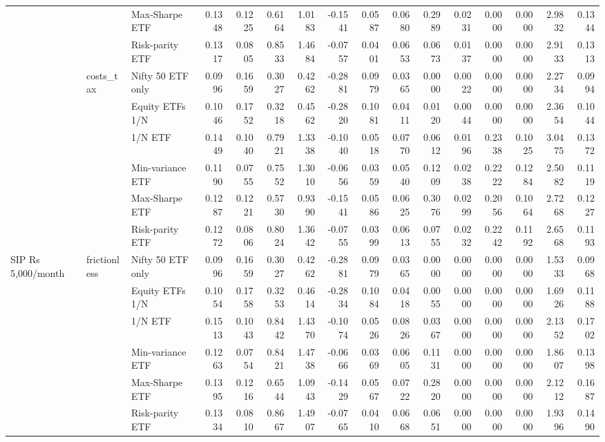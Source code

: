 \begin{table}
{\begin{tabular}{lllrrrrrrrrrrrrr}
 &  & Max-Sharpe ETF & 0.1348 & 0.1225 & 0.6164 & 1.0183 & -0.1541 & 0.0587 & 0.0680 & 0.2989 & 0.0231 & 0.0000 & 0.0000 & 2.9832 & 0.1344 \\
 &  & Risk-parity ETF & 0.1317 & 0.0805 & 0.8533 & 1.4684 & -0.0757 & 0.0401 & 0.0653 & 0.0673 & 0.0137 & 0.0000 & 0.0000 & 2.9133 & 0.1313 \\
\cline{2-16}
 & \multirow[t]{6}{*}{costs\_tax} & Nifty 50 ETF only & 0.0996 & 0.1659 & 0.3027 & 0.4262 & -0.2881 & 0.0979 & 0.0365 & 0.0000 & 0.0022 & 0.0000 & 0.0000 & 2.2734 & 0.0994 \\
 &  & Equity ETFs 1/N & 0.1046 & 0.1752 & 0.3218 & 0.4562 & -0.2820 & 0.1081 & 0.0411 & 0.0120 & 0.0044 & 0.0000 & 0.0000 & 2.3654 & 0.1044 \\
 &  & 1/N ETF & 0.1449 & 0.1040 & 0.7921 & 1.3338 & -0.1040 & 0.0518 & 0.0770 & 0.0612 & 0.0196 & 0.2338 & 0.1025 & 3.0475 & 0.1372 \\
 &  & Min-variance ETF & 0.1190 & 0.0755 & 0.7552 & 1.3010 & -0.0656 & 0.0359 & 0.0540 & 0.1209 & 0.0238 & 0.2222 & 0.1284 & 2.5082 & 0.1119 \\
 &  & Max-Sharpe ETF & 0.1287 & 0.1221 & 0.5730 & 0.9390 & -0.1541 & 0.0586 & 0.0625 & 0.3076 & 0.0299 & 0.2056 & 0.1064 & 2.7268 & 0.1227 \\
 &  & Risk-parity ETF & 0.1272 & 0.0806 & 0.8024 & 1.3642 & -0.0755 & 0.0399 & 0.0613 & 0.0755 & 0.0232 & 0.2242 & 0.1192 & 2.6568 & 0.1193 \\
\cline{1-16} \cline{2-16}
\multirow[t]{18}{*}{SIP Rs 5,000/month} & \multirow[t]{6}{*}{frictionless} & Nifty 50 ETF only & 0.0996 & 0.1659 & 0.3027 & 0.4262 & -0.2881 & 0.0979 & 0.0365 & 0.0000 & 0.0000 & 0.0000 & 0.0000 & 1.5333 & 0.0968 \\
 &  & Equity ETFs 1/N & 0.1054 & 0.1758 & 0.3253 & 0.4614 & -0.2834 & 0.1084 & 0.0418 & 0.0055 & 0.0000 & 0.0000 & 0.0000 & 1.6926 & 0.1188 \\
 &  & 1/N ETF & 0.1513 & 0.1043 & 0.8442 & 1.4370 & -0.1074 & 0.0526 & 0.0826 & 0.0367 & 0.0000 & 0.0000 & 0.0000 & 2.1352 & 0.1702 \\
 &  & Min-variance ETF & 0.1263 & 0.0754 & 0.8421 & 1.4738 & -0.0666 & 0.0369 & 0.0605 & 0.1131 & 0.0000 & 0.0000 & 0.0000 & 1.8607 & 0.1398 \\
 &  & Max-Sharpe ETF & 0.1395 & 0.1216 & 0.6544 & 1.0943 & -0.1429 & 0.0567 & 0.0722 & 0.2820 & 0.0000 & 0.0000 & 0.0000 & 2.1212 & 0.1687 \\
 &  & Risk-parity ETF & 0.1334 & 0.0810 & 0.8667 & 1.4907 & -0.0765 & 0.0410 & 0.0668 & 0.0651 & 0.0000 & 0.0000 & 0.0000 & 1.9396 & 0.1490 \\

\end{tabular}}
\end{table}
